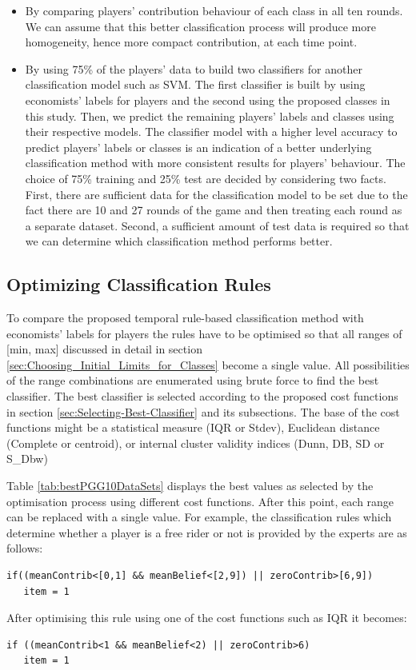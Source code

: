 \begin{itemize}
    \item By comparing players' contribution behaviour of each class in all ten rounds. We can assume that this better classification process will produce more homogeneity, hence more compact contribution, at each time point.
    
    \item By using 75\% of the players' data to build two classifiers for another classification model such as SVM. The first classifier is built by using economists' labels for players and the second using the proposed classes in this study. Then, we predict the remaining players' labels and classes using their respective models. The classifier model with a higher level accuracy to predict players' labels or classes is an indication of a better underlying classification method with more consistent results for players' behaviour. The choice of 75\% training and 25\% test are decided by considering two facts. First, there are sufficient data for the classification model to be set due to the fact there are 10 and 27 rounds of the game and then treating each round as a separate dataset. Second, a sufficient amount of test data is required so that we can determine which classification method performs better.
\end{itemize} 


\subsection{Optimizing Classification Rules}

To compare the proposed temporal rule-based classification method with economists' labels for players the rules have to be optimised so that all ranges of [min, max] discussed in detail in section \ref{sec:Choosing_Initial_Limits_for_Classes} become a single value. All possibilities of the range combinations are enumerated using brute force to find the best classifier. The best classifier is selected according to the proposed cost functions in section \ref{sec:Selecting-Best-Classifier} and its subsections. The base of the cost functions might be a statistical measure (IQR or Stdev), Euclidean distance (Complete or centroid), or internal cluster validity indices (Dunn, DB, SD or S\_Dbw)

Table \ref{tab:bestPGG10DataSets} displays the best values as selected by the optimisation process using different cost functions. After this point, each range can be replaced with a single value. For example, the classification rules which determine whether a player is a free rider or not is provided by the experts are as follows:
{\small
\begin{lstlisting}
if((meanContrib<[0,1] && meanBelief<[2,9]) || zeroContrib>[6,9])
   item = 1
\end{lstlisting}
}
After optimising this rule using one of the cost functions such as IQR it becomes:
{\small
\begin{lstlisting}
if ((meanContrib<1 && meanBelief<2) || zeroContrib>6)
   item = 1
\end{lstlisting}
}



